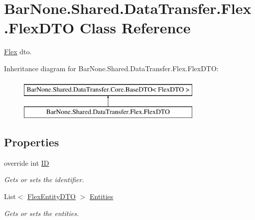 \hypertarget{class_bar_none_1_1_shared_1_1_data_transfer_1_1_flex_1_1_flex_d_t_o}{}\section{Bar\+None.\+Shared.\+Data\+Transfer.\+Flex.\+Flex\+D\+TO Class Reference}
\label{class_bar_none_1_1_shared_1_1_data_transfer_1_1_flex_1_1_flex_d_t_o}


\mbox{\hyperlink{namespace_bar_none_1_1_shared_1_1_data_transfer_1_1_flex}{Flex}} dto.  


Inheritance diagram for Bar\+None.\+Shared.\+Data\+Transfer.\+Flex.\+Flex\+D\+TO\+:\begin{figure}[H]
\begin{center}
\leavevmode
\includegraphics[height=2.000000cm]{class_bar_none_1_1_shared_1_1_data_transfer_1_1_flex_1_1_flex_d_t_o}
\end{center}
\end{figure}
\subsection*{Properties}
\begin{DoxyCompactItemize}
\item 
override int \mbox{\hyperlink{class_bar_none_1_1_shared_1_1_data_transfer_1_1_flex_1_1_flex_d_t_o_a27f1793164b51a87f3c04749a099ca98}{ID}}
\begin{DoxyCompactList}\small\item\em Gets or sets the identifier. \end{DoxyCompactList}\item 
List$<$ \mbox{\hyperlink{class_bar_none_1_1_shared_1_1_data_transfer_1_1_flex_1_1_flex_entity_d_t_o}{Flex\+Entity\+D\+TO}} $>$ \mbox{\hyperlink{class_bar_none_1_1_shared_1_1_data_transfer_1_1_flex_1_1_flex_d_t_o_ae3cf130bf50b25dc0286bb932c3881be}{Entities}}
\begin{DoxyCompactList}\small\item\em Gets or sets the entities. \end{DoxyCompactList}\end{DoxyCompactItemize}


